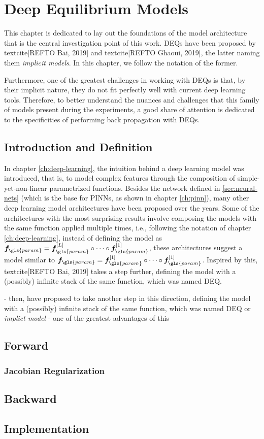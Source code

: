 \chapter{Deep Equilibrium Models}\label{ch:deq}

This chapter is dedicated to lay out the foundations of the model architecture that is the central investigation point of this work.
\gls{DEQ}s have been proposed by textcite[REFTO Bai, 2019] and textcite[REFTO Ghaoui, 2019], the latter naming them \emph{implicit models}.
In this chapter, we follow the notation of the former.

Furthermore, one of the greatest challenges in working with \gls{DEQ}s is that, by their implicit nature, they do not fit perfectly well with current deep learning tools.
Therefore, to better understand the nuances and challenges that this family of models present during the experiments, a good share of attention is dedicated to the specificities of performing back propagation with \gls{DEQ}s.

\section{Introduction and Definition}

In chapter \ref{ch:deep-learning}, the intuition behind a deep learning model was introduced, that is, to model complex features through the composition of simple-yet-non-linear parametrized functions.
Besides the network defined in \ref{sec:neural-nets} (which is the base for \gls{PINN}s, as shown in chapter \ref{ch:pinn}), many other deep learning model architectures have been proposed over the years.
Some of the architectures with the most surprising results involve composing the models with the same function applied multiple times, i.e., following the notation of chapter \ref{ch:deep-learning}, instead of defining the model as $\bm{f}_{\gls{param}}=\bm{f}_{\gls{param}}^{[L]}\circ \cdots \circ \bm{f}_{\gls{param}}^{[1]}$, these architectures suggest a model similar to $\bm{f}_{\gls{param}}=\bm{f}_{\gls{param}}^{[1]}\circ \cdots \circ \bm{f}_{\gls{param}}^{[1]}$.
Inspired by this, textcite[REFTO Bai, 2019] takes a step further, defining the model with a (possibly) infinite stack of the same function, which was named \gls{DEQ}.

- then, have proposed to take another step in this direction, defining the model with a (possibly) infinite stack of the same function, which was named \gls{DEQ} or \emph{implict model}
- one of the greatest advantages of this

\section{Forward}

\subsection{Jacobian Regularization}

\section{Backward}

\section{Implementation}

